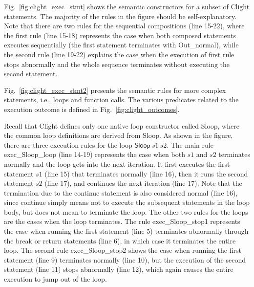 Fig.~\ref{fig:clight_exec_stmt} shows the semantic constructors for a subset
of Clight statements. The majority of the rules in the figure should be
self-explanatory. Note that there are two rules for the sequential compositions
(line 15-22), where the first rule (line 15-18) represents the case when
both composed statements executes sequentially (the first statement terminates
with \textsf{Out\_normal}), while the second rule (line 19-22) explains
the case when the execution of first rule stops abnormally and the whole sequence
terminates without executing the second statement.

Fig.~\ref{fig:clight_exec_stmt2} presents the semantic rules for more
complex statements, i.e., loops and function calls.
The various predicates related to the execution outcome is defined in
Fig.~\ref{fig:clight_outcomes}.

Recall that Clight defines only one native loop constructor called \textsf{Sloop},
where the common loop definitions are derived from \textsf{Sloop}.
As shown in the figure, there are three execution rules for the loop $\textsf{Sloop}~s1~s2$.
The main rule \textsf{exec\_Sloop\_loop} (line 14-19) represents the case
when both $s1$ and $s2$ terminates normally and the loop gets into the next iteration.
It first executes the first statement $s1$ (line 15) that terminates normally (line 16),
then it runs the second statement $s2$ (line 17), and continues the next iteration (line 17).
Note that the termination due to the \textsf{continue} statement is also
considered normal (line 16), since \textsf{continue} simply means not to execute
the subsequent statements in the loop body, but does not mean to terminate the loop.
The other two rules for the loops are the cases when the loop terminates.
The rule \textsf{exec\_Sloop\_stop1} represents the case when running the first statement
(line 5) terminates abnormally through the \textsf{break} or \textsf{return} statements
(line 6), in which case it terminates the entire loop.
The second rule \textsf{exec\_Sloop\_stop2} shows the case when running the first
statement (line 9) terminates normally (line 10), but the execution of the second
statement (line 11) stops abnormally (line 12), which again causes the entire execution
to jump out of the loop.

